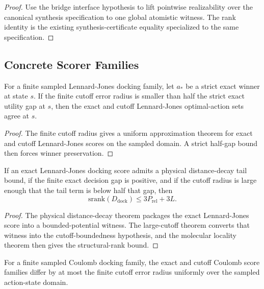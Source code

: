\begin{proof}
Use the bridge interface hypothesis to lift pointwise realizability over the canonical synthesis specification to one global atomistic witness. The rank identity is the existing synthesis-certificate equality specialized to the same specification.
\end{proof}

\subsection{Concrete Scorer Families}

\begin{theorem}\label{thm:lj-cutoff-invariance}
For a finite sampled Lennard-Jones docking family, let $a_\ast$ be a strict exact winner at state $s$. If the finite cutoff error radius is smaller than half the strict exact utility gap at $s$, then the exact and cutoff Lennard-Jones optimal-action sets agree at $s$.
\end{theorem}

\begin{proof}
The finite cutoff radius gives a uniform approximation theorem for exact and cutoff Lennard-Jones scores on the sampled domain. A strict half-gap bound then forces winner preservation.
\end{proof}

\begin{theorem}\label{thm:lj-tail-srank}
If an exact Lennard-Jones docking score admits a physical distance-decay tail bound, if the finite exact decision gap is positive, and if the cutoff radius is large enough that the tail term is below half that gap, then
\[
\mathrm{srank}(D_{\mathrm{dock}}) \le 3P_{\mathrm{rel}} + 3L.
\]
\end{theorem}

\begin{proof}
The physical distance-decay theorem packages the exact Lennard-Jones score into a bounded-potential witness. The large-cutoff theorem converts that witness into the cutoff-boundedness hypothesis, and the molecular locality theorem then gives the structural-rank bound.
\end{proof}

\begin{theorem}\label{thm:coulomb-cutoff-uniform-approx}
For a finite sampled Coulomb docking family, the exact and cutoff Coulomb score families differ by at most the finite cutoff error radius uniformly over the sampled action-state domain.
\end{theorem}

